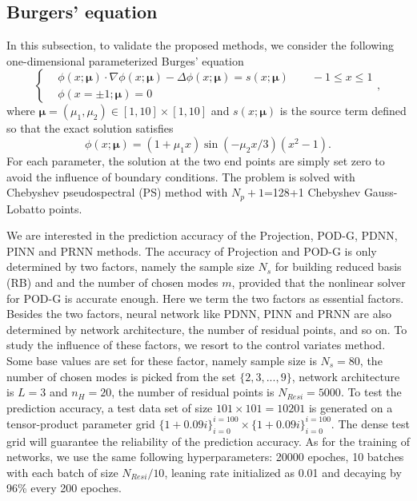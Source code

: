 \documentclass[preprint, 10pt]{elsarticle}
\begin{document}
\subsection{Burgers' equation}
In this subsection, to validate the proposed methods, we consider the  following one-dimensional parameterized Burges' equation
\begin{equation}
\left\{
\begin{aligned}
	 &\phi(x;\pmb{\mu}) \cdot \nabla \phi(x;\pmb{\mu}) -  \Delta \phi(x;\pmb{\mu})= s(x;\pmb{\mu})  \qquad -1 \le x \le 1\\
	 &\phi\left ( x= \pm1; \pmb {\mu} \right ) = 0
\end{aligned}\right.
,
\end{equation}
where $\pmb{\mu} =(\mu_1, \mu_2) \in [1,10] \times [1,10]$ and $s(x;\pmb{\mu})$ is the source term defined so that the exact solution satisfies
\begin{equation}
	\phi(x; \pmb{\mu}) = (1+\mu_1 x)\sin(-\mu_2 x/3) (x^2-1) .
\end{equation}
For each parameter, the solution at the two end points are simply set zero to avoid the influence of boundary conditions. The problem is solved with Chebyshev pseudospectral (PS) method with $N_p+1$=128+1 Chebyshev Gauss-Lobatto points.


We are interested in the prediction accuracy of the Projection, POD-G, PDNN, PINN and PRNN methods. The accuracy of Projection and POD-G is only determined by two factors, namely the sample size $N_s$ for building reduced basis (RB) and and the number of chosen modes $m$, provided that the nonlinear solver for POD-G is accurate enough. Here we term the two factors as essential factors.
Besides the two factors, neural network like PDNN, PINN and PRNN are also determined by network architecture, the number of residual points, and so on. To study the influence of these factors, we resort to the control variates method. Some base values are set for these factor, namely sample size is $N_s=80$, the number of chosen modes is picked from the set $\{2,3,...,9\}$,  network architecture is $L=3$ and $n_H=20$, the number of residual points is $N_{Resi}=5000$. To test the prediction accuracy, a test data set of size $101 \times 101=10201$ is generated on a tensor-product parameter grid $\{1+ 0.09i\}_{i=0}^{i=100} \times \{1+ 0.09i\}_{i=0}^{i=100}$. The dense test grid will guarantee the reliability of the prediction accuracy. As for the training of networks, we use the same following hyperparameters: 20000 epoches, 10 batches with each batch of size $N_{Resi}/10$, leaning rate initialized as 0.01 and decaying by 96\% every 200 epoches.
\end{document}
